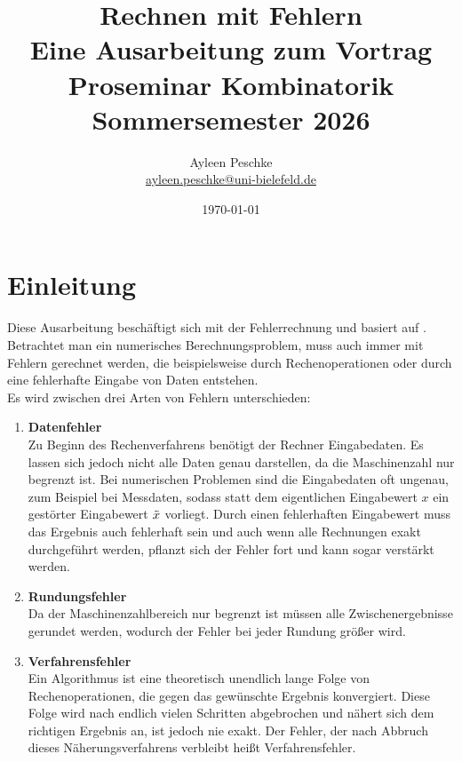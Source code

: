 \documentclass[12pt]{article}
\title{Rechnen mit Fehlern \\ [0.5em] \Large Eine Ausarbeitung zum Vortrag \\ Proseminar Kombinatorik \\ Sommersemester 2026}
\author{Ayleen Peschke \\ \url{ayleen.peschke@uni-bielefeld.de}}
\date{\today}
\begin{document}
\maketitle
\thispagestyle{empty}
\newpage

\tableofcontents
\newpage
{}

\section{Einleitung}
Diese Ausarbeitung beschäftigt sich mit der Fehlerrechnung und basiert auf \cite{hougardy2018}. \\
Betrachtet man ein numerisches Berechnungsproblem, muss auch immer mit Fehlern gerechnet werden, die beispielsweise durch Rechenoperationen oder durch eine fehlerhafte Eingabe von Daten entstehen. \\
Es wird zwischen drei Arten von Fehlern unterschieden: 

\begin{enumerate}
    \item \textbf{Datenfehler} \\ 
Zu Beginn des Rechenverfahrens benötigt der Rechner Eingabedaten. Es lassen sich jedoch nicht alle Daten genau darstellen, da die Maschinenzahl nur begrenzt ist. Bei numerischen Problemen sind die Eingabedaten oft ungenau, zum Beispiel bei Messdaten, sodass statt dem eigentlichen Eingabewert $x$ ein gestörter Eingabewert $\Tilde{x}$ vorliegt. Durch einen fehlerhaften Eingabewert muss das Ergebnis auch fehlerhaft sein und auch wenn alle Rechnungen exakt durchgeführt werden, pflanzt sich der Fehler fort und kann sogar verstärkt werden. 

\item \textbf{Rundungsfehler} \\
Da der Maschinenzahlbereich nur begrenzt ist müssen alle Zwischenergebnisse gerundet werden, wodurch der Fehler bei jeder Rundung größer wird. 

\item \textbf{Verfahrensfehler} \\
Ein Algorithmus ist eine theoretisch unendlich lange Folge von Rechenoperationen, die gegen das gewünschte Ergebnis konvergiert. Diese Folge wird nach endlich vielen Schritten abgebrochen und nähert sich dem richtigen Ergebnis an, ist jedoch nie exakt. Der Fehler, der nach Abbruch dieses Näherungsverfahrens verbleibt heißt Verfahrensfehler. 
\end{enumerate}
\end{document}
